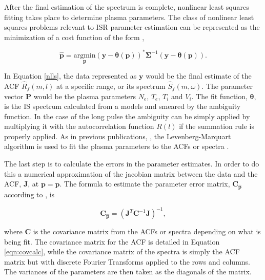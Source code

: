 \documentclass[draft,ras]{agutex}
\newcommand{\pcom}[2]{\marginpar{{\footnotesize \bf #1}}{\it {#2}}}
\begin{document}
\begin{article}
After the final estimation of the spectrum is complete, nonlinear least squares fitting takes place to determine plasma parameters.  
The class of nonlinear least squares problems relevant to ISR parameter estimation can be represented as the minimization of a cost function of the form \citep{kayvol1},

\begin{equation}
	\mathbf{\hat{p}}= \underset{\mathbf{p}}{\text{argmin}} (\mathbf{y}-\bm{\theta}(\mathbf{p}))^*\bm{\Sigma}^{-1}(\mathbf{y}-\bm{\theta}(\mathbf{p})).
\label{nlls}
\end{equation}

In Equation \ref{nlls}, the data represented as $\mathbf{y}$ would be the final estimate of the ACF $\widehat{R}_f(m,l)$ at a specific range, or its spectrum $\widehat{S}_f(m,\omega)$. The parameter vector $\mathbf{P}$ would be the plasma parameters $N_e$, $T_e$, $T_i$ and $V_i$. The fit function, $\bm{\theta}$, is the IS spectrum calculated from a models \citep[e.g.,][]{kudeki:milla:1} and smeared by the ambiguity function. In the case of the long pulse the ambiguity can be simply applied by multiplying it with the autocorrelation function $R(l)$ if the summation rule is properly applied. As in previous publications, \citep[e.g.,][]{nikoukar2008}, the Levenberg-Marquart algorithm is used to fit the plasma parameters to the ACFs or spectra \citep{levenberg1944,marquardt:1963}.

The last step is to calculate the errors in the parameter estimates. In order to do this a numerical approximation of the jacobian matrix between the data and the ACF, $\mathbf{J}$, at $\mathbf{p}=\mathbf{\hat{p}}$. The formula to estimate the parameter error matrix, $\mathbf{C}_{\mathbf{\hat{p}}}$ according to \citet{Hysell:2000cq}, is


\begin{equation}
\label{eqn:jacinv}
\mathbf{C}_{\mathbf{\hat{p}}}=(\mathbf{J}^T \mathbf{C}^{-1}\mathbf{J})^{-1},
\end{equation}

\noindent where $ \mathbf{C}$ is the covariance matrix from the ACFs or spectra depending on what is being fit. The covariance matrix for the ACF is detailed in Equation \ref{eqn:covcalc}, while the covariance matrix of the spectra is simply the ACF matrix but with discrete Fourier Transforms applied to the rows and columns. The variances of the parameters are then taken as the diagonals of the matrix.



\end{article}
\end{document}
